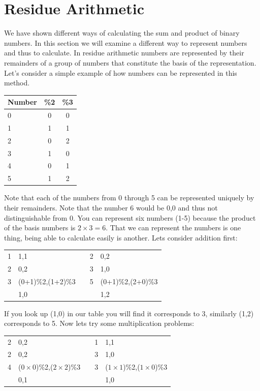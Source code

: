 \section{Residue Arithmetic}

We have shown different ways of calculating the sum and product of binary numbers.  In this section we will examine a different way to represent numbers and thus to calculate.  In residue arithmetic numbers are represented by their remainders of a group of numbers that constitute the basis of the representation.   Let's consider a simple example of how numbers can be represented in this method.

\begin{tabular}{|l|cc|} \hline
  Number & \%2 & \%3 \\ \hline
  0      & 0   & 0   \\
  1      & 1   & 1   \\ \hline
  2      & 0   & 2   \\
  3      & 1   & 0   \\ \hline
  4      & 0   & 1   \\
  5      & 1   & 2   \\ \hline
\end{tabular}

Note that each of the numbers from 0 through 5 can be represented uniquely by their remainders.  Note that the number 6 would be 0,0 and thus not distinguishable from 0.  You can represent six numbers (1-5) because the product of the basis numbers is $2\times 3=6$.  That we can represent the numbers is one thing, being able to calculate easily is another.  Lets consider addition first:

\begin{tabular}{r@{=}lcr@{=}l}
1 & 1,1               && 2 & 0,2 \\
2 & 0,2               && 3 & 1,0 \\ \cline{1-2}\cline{4-5}
3 & (0+1)\%2,(1+2)\%3 && 5 & (0+1)\%2,(2+0)\%3 \\
  & 1,0               &&   & 1,2 \\
\end{tabular}

If you look up (1,0) in our table you will find it corresponds to 3, similarly (1,2) corresponds to 5.  Now lets try some multiplication problems:

\begin{tabular}{r@{=}lcr@{=}l}
2 & 0,2                               && 1 & 1,1 \\
2 & 0,2                               && 3 & 1,0 \\ \cline{1-2}\cline{4-5}
4 & ($0\times 0$)\%2,($2\times 2$)\%3 && 3 & ($1\times 1$)\%2,($1\times 0$)\%3 \\
  & 0,1                               &&   & 1,0 \\
\end{tabular}

